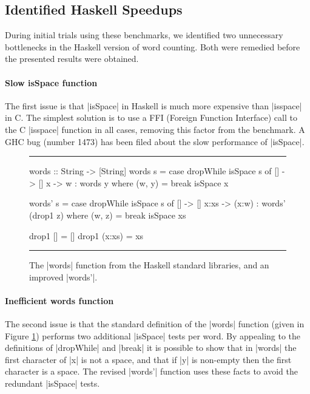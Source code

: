 \documentclass{llncs}
\newenvironment{fig}
    {\begin{figure}[tbp]\hrule}
    {\end{figure}}
\newcommand{\figend}{\hrule}
\begin{document}
\subsection{Identified Haskell Speedups}

During initial trials using these benchmarks, we identified two unnecessary bottlenecks in the Haskell version of word counting. Both were remedied before the presented results were obtained.

\paragraph{Slow \textsf{isSpace} function}

The first issue is that |isSpace| in Haskell is much more expensive than |isspace| in C. The simplest solution is to use a FFI (Foreign Function Interface) \cite{spj:awkward_squad} call to the C |isspace| function in all cases, removing this factor from the benchmark. A GHC bug (number 1473) has been filed about the slow performance of |isSpace|.

\begin{fig}
\begin{code}
words :: String -> [String]
words s = case  dropWhile isSpace s of
                []  ->  []
                x   ->  w : words y
                        where (w, y) = break isSpace x

words' s = case  dropWhile isSpace s of
                 []    ->  []
                 x:xs  ->  (x:w) : words' (drop1 z)
                           where (w, z) = break isSpace xs

drop1 []      = []
drop1 (x:xs)  = xs
\end{code}
\figend
\caption{The |words| function from the Haskell standard libraries, and an improved |words'|.}
\label{fig:words}
\end{fig}

\paragraph{Inefficient \textsf{words} function}

The second issue is that the standard definition of the |words| function (given in Figure \ref{fig:words}) performs two additional |isSpace| tests per word. By appealing to the definitions of |dropWhile| and |break| it is possible to show that in |words| the first character of |x| is not a space, and that if |y| is non-empty then the first character is a space. The revised |words'| function uses these facts to avoid the redundant |isSpace| tests.
\end{document}
